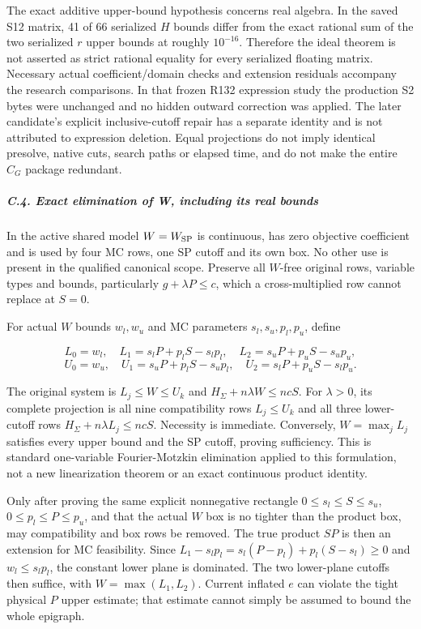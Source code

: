 \documentclass[
  american,
  11pt,
]{article}
\begin{document}
The exact additive upper-bound hypothesis concerns real algebra. In the
saved S12 matrix, 41 of 66 serialized \(H\) bounds differ from the exact
rational sum of the two serialized \(r\) upper bounds at roughly
\(10^{-16}\). Therefore the ideal theorem is not asserted as strict
rational equality for every serialized floating matrix. Necessary actual
coefficient/domain checks and extension residuals accompany the research
comparisons. In that frozen R132 expression study the production S2
bytes were unchanged and no hidden outward correction was applied. The
later candidate's explicit inclusive-cutoff repair has a separate
identity and is not attributed to expression deletion. Equal projections
do not imply identical presolve, native cuts, search paths or elapsed
time, and do not make the entire \(C_G\) package redundant.

\subparagraph{C.4. Exact elimination of W, including its real
bounds}\label{c.4.-exact-elimination-of-w-including-its-real-bounds}

In the active shared model \(W=W_{\rm SP}\) is continuous, has zero
objective coefficient and is used by four MC rows, one SP cutoff and its
own box. No other use is present in the qualified canonical scope.
Preserve all \(W\)-free original rows, variable types and bounds,
particularly \(g+\lambda P\le c\), which a cross-multiplied row cannot
replace at \(S=0\).

For actual \(W\) bounds \(w_l,w_u\) and MC parameters
\(s_l,s_u,p_l,p_u\), define

\[
L_0=w_l,\quad L_1=s_lP+p_lS-s_lp_l,\quad
L_2=s_uP+p_uS-s_up_u,
\] \[
U_0=w_u,\quad U_1=s_uP+p_lS-s_up_l,\quad
U_2=s_lP+p_uS-s_lp_u.
\]

The original system is \(L_j\le W\le U_k\) and
\(H_\Sigma+n\lambda W\le ncS\). For \(\lambda>0\), its complete
projection is all nine compatibility rows \(L_j\le U_k\) and all three
lower-cutoff rows \(H_\Sigma+n\lambda L_j\le ncS\). Necessity is
immediate. Conversely, \(W=\max_jL_j\) satisfies every upper bound and
the SP cutoff, proving sufficiency. This is standard one-variable
Fourier-Motzkin elimination applied to this formulation, not a new
linearization theorem or an exact continuous product identity.

Only after proving the same explicit nonnegative rectangle
\(0\le s_l\le S\le s_u\), \(0\le p_l\le P\le p_u\), and that the actual
\(W\) box is no tighter than the product box, may compatibility and box
rows be removed. The true product \(SP\) is then an extension for MC
feasibility. Since \(L_1-s_lp_l=s_l(P-p_l)+p_l(S-s_l)\ge0\) and
\(w_l\le s_lp_l\), the constant lower plane is dominated. The two
lower-plane cutoffs then suffice, with \(W=\max(L_1,L_2)\). Current
inflated \(e\) can violate the tight physical \(P\) upper estimate; that
estimate cannot simply be assumed to bound the whole epigraph.
\end{document}
